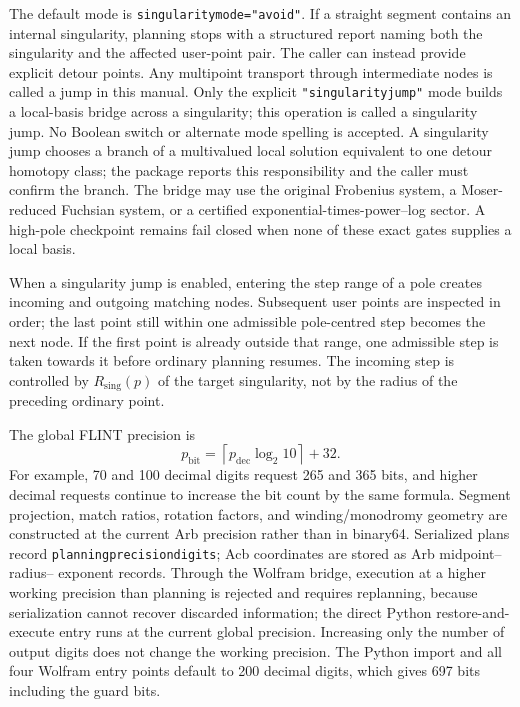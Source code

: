 \documentclass[11pt]{article}
\renewcommand{\_}{\origunderscore\allowbreak}
\begin{document}
The default mode is \texttt{singularity\_mode="avoid"}.  If a straight segment contains
an internal singularity, planning stops with a structured report naming both the singularity
and the affected user-point pair.  The caller can instead provide explicit detour points.
Any multipoint transport through intermediate nodes is called a jump in this manual.  Only
the explicit \texttt{"singularity\_jump"} mode builds a local-basis bridge across a
singularity; this operation is called a singularity jump.  No Boolean switch or alternate
mode spelling is accepted.  A singularity jump
chooses a branch of a multivalued local solution equivalent to one detour homotopy class;
the package reports this responsibility and the caller must confirm the branch.  The bridge
may use the original Frobenius system, a
Moser-reduced Fuchsian system, or a certified exponential-times-power--log sector.  A
high-pole checkpoint remains fail closed when none of these exact gates supplies a local
basis.

When a singularity jump is enabled, entering the step range of a pole creates incoming and outgoing
matching nodes.  Subsequent user points are inspected in order; the last point still within
one admissible pole-centred step becomes the next node.  If the first point is already
outside that range, one admissible step is taken towards it before ordinary planning resumes.
The incoming step is controlled by $R_{\mathrm{sing}}(p)$ of the target singularity, not by
the radius of the preceding ordinary point.

The global FLINT precision is
\begin{equation}
 p_{\mathrm{bit}}=\left\lceil p_{\mathrm{dec}}\log_2 10\right\rceil+32.
\end{equation}
For example, 70 and 100 decimal digits request 265 and 365 bits, and higher decimal requests
continue to increase the bit count by the same formula.  Segment projection, match ratios,
rotation factors, and winding/monodromy geometry are constructed at the current Arb
precision rather than in binary64.  Serialized plans record
\texttt{planning\_precision\_digits}; Acb coordinates are stored as Arb midpoint--radius--
exponent records.  Through the Wolfram bridge, execution at a higher working precision than
planning is rejected and requires replanning, because serialization cannot recover discarded
information; the direct Python restore-and-execute entry runs at the current global
precision.  Increasing
only the number of output digits does not change the working precision.
The Python import and all four Wolfram entry points default to 200 decimal digits, which gives
697 bits including the guard bits.
\end{document}
